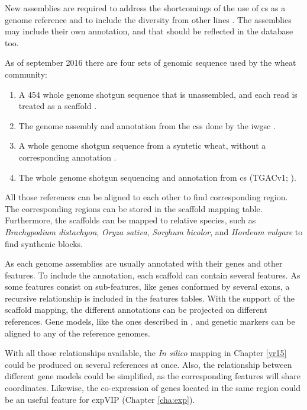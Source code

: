New assemblies are required to address the shortcomings of the use of \acrshort{cs} as a genome reference and to include the diversity from other lines \citep{Allen2016,Winfield2016}. 
The assemblies may include their own annotation, and that should be reflected in the database too. 

As of september 2016 there are four sets of genomic sequence used by the wheat community:
\begin{enumerate}
	\item  A 454 whole genome shotgun sequence that is unassembled, and each read is treated as a scaffold \citep{Brenchley2012}.
	\item The genome assembly and annotation from the \gls{css} done by the \acrshort{iwgsc} \citep{Mayer2014}.
	\item A whole genome shotgun sequence from a syntetic wheat, without a corresponding annotation \citep{Chapman2015}.
	\item The whole genome shotgun sequencing and annotation from \acrshort{cs} (TGACv1; \citealt{Clark2016}).
\end{enumerate}

All those references can be aligned to each other to find corresponding region. 
The corresponding regions can be stored in the scaffold mapping table. 
Furthermore, the scaffolds can be mapped to relative species, such as \textit{Brachypodium distachyon}, \textit{Oryza sativa}, \textit{Sorghum bicolor}, and \textit{Hordeum vulgare} to find synthenic blocks. 

As each genome assemblies are usually annotated with their genes and other features. 
To include the annotation, each scaffold can contain several features. 
As some features consist on sub-features, like genes conformed by several exons, a recursive relationship is included in the features tables. 
With the support of the scaffold mapping, the different annotations can be projected on different references. 
Gene models, like the ones described in \citep{Krasileva2013}, and  genetic markers can be aligned to any of the reference genomes.

With all those relationships available, the \textit{In silico} mapping in Chapter \ref{yr15} could be produced on several references at once. 
Also, the relationship between different gene models could be simplified, as the corresponding features will share coordinates.
Likewise, the co-expression of genes located in the same region could be an useful feature for expVIP (Chapter \ref{cha:exp}). 

